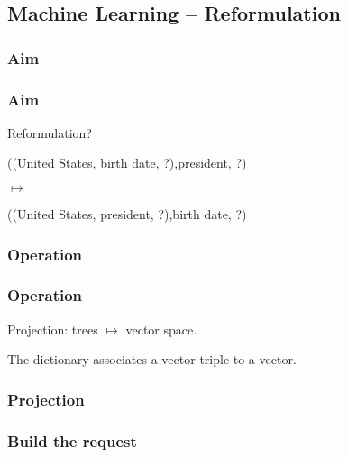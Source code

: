 \subsection{Machine Learning \--- Reformulation}

\subsubsection{Aim}

\begin{frame}
\frametitle{Aim}
\alert{Reformulation?}

\pause


((United States, birth date, ?),president, ?)

$\mapsto$

((United States, president, ?),birth date, ?)

\end{frame}

\subsubsection{Operation}
\begin{frame}
\frametitle{Operation}
\alert{Projection:} trees $\mapsto$ vector space.

The dictionary associates a vector triple to a vector.
\end{frame}

\begin{frame}
\frametitle{Projection}
\end{frame}

\subsubsection{Build the request}

